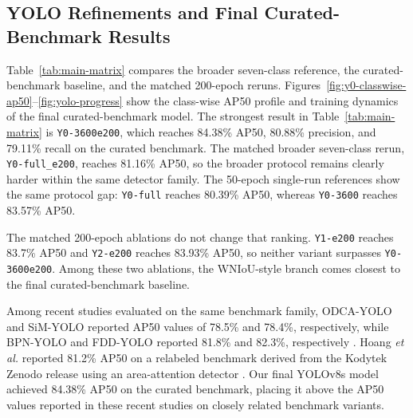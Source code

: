 \documentclass[cmc,article,submit,moreauthors,pdftex]{Definitions/tsp}
\begin{document}
\subsection{YOLO Refinements and Final Curated-Benchmark Results}
\label{sec:main-results}

Table~\ref{tab:main-matrix} compares the broader seven-class reference, the curated-benchmark baseline, and the matched 200-epoch reruns. Figures~\ref{fig:y0-classwise-ap50}--\ref{fig:yolo-progress} show the class-wise AP50 profile and training dynamics of the final curated-benchmark model. The strongest result in Table~\ref{tab:main-matrix} is \texttt{Y0-3600e200}, which reaches 84.38\% AP50, 80.88\% precision, and 79.11\% recall on the curated benchmark. The matched broader seven-class rerun, \texttt{Y0-full\_e200}, reaches 81.16\% AP50, so the broader protocol remains clearly harder within the same detector family. The 50-epoch single-run references show the same protocol gap: \texttt{Y0-full} reaches 80.39\% AP50, whereas \texttt{Y0-3600} reaches 83.57\% AP50.

The matched 200-epoch ablations do not change that ranking. \texttt{Y1-e200} reaches 83.7\% AP50 and \texttt{Y2-e200} reaches 83.93\% AP50, so neither variant surpasses \texttt{Y0-3600e200}. Among these two ablations, the WNIoU-style branch comes closest to the final curated-benchmark baseline.

Among recent studies evaluated on the same benchmark family, ODCA-YOLO and SiM-YOLO reported AP50 values of 78.5\% and 78.4\%, respectively, while BPN-YOLO and FDD-YOLO reported 81.8\% and 82.3\%, respectively \citep{odca_yolo,bpn_yolo,sim_yolo,fdd_yolo}. Hoang \textit{et al.} reported 81.2\% AP50 on a relabeled benchmark derived from the Kodytek Zenodo release using an area-attention detector \citep{cmc_wood_area_attention}. Our final YOLOv8s model achieved 84.38\% AP50 on the curated benchmark, placing it above the AP50 values reported in these recent studies on closely related benchmark variants.
\end{document}
